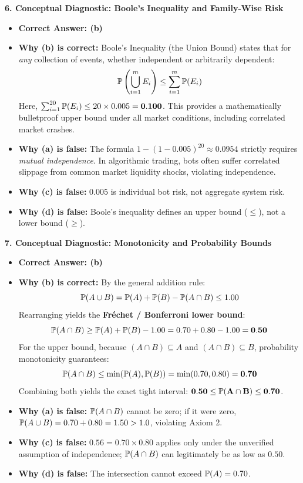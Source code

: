 \textbf{6. Conceptual Diagnostic: Boole's Inequality and Family-Wise Risk}
\begin{itemize}
    \item \textbf{Correct Answer: (b)}
    \item \textbf{Why (b) is correct:} Boole's Inequality (the Union Bound) states that for \emph{any} collection of events, whether independent or arbitrarily dependent:
    $$\P\left(\bigcup_{i=1}^m E_i\right) \le \sum_{i=1}^m \P(E_i)$$
    Here, $\sum_{i=1}^{20} \P(E_i) \le 20 \times 0.005 = \mathbf{0.100}$. This provides a mathematically bulletproof upper bound under all market conditions, including correlated market crashes.
    \item \textbf{Why (a) is false:} The formula $1 - (1 - 0.005)^{20} \approx 0.0954$ strictly requires \emph{mutual independence}. In algorithmic trading, bots often suffer correlated slippage from common market liquidity shocks, violating independence.
    \item \textbf{Why (c) is false:} $0.005$ is individual bot risk, not aggregate system risk.
    \item \textbf{Why (d) is false:} Boole's inequality defines an upper bound ($\le$), not a lower bound ($\ge$).
\end{itemize}

\textbf{7. Conceptual Diagnostic: Monotonicity and Probability Bounds}
\begin{itemize}
    \item \textbf{Correct Answer: (b)}
    \item \textbf{Why (b) is correct:} By the general addition rule:
    $$\P(A \cup B) = \P(A) + \P(B) - \P(A \cap B) \le 1.00$$
    Rearranging yields the \textbf{Fréchet / Bonferroni lower bound}:
    $$\P(A \cap B) \ge \P(A) + \P(B) - 1.00 = 0.70 + 0.80 - 1.00 = \mathbf{0.50}$$
    For the upper bound, because $(A \cap B) \subseteq A$ and $(A \cap B) \subseteq B$, probability monotonicity guarantees:
    $$\P(A \cap B) \le \min(\P(A), \P(B)) = \min(0.70, 0.80) = \mathbf{0.70}$$
    Combining both yields the exact tight interval: $\mathbf{0.50 \le \P(A \cap B) \le 0.70}$.
    \item \textbf{Why (a) is false:} $\P(A \cap B)$ cannot be zero; if it were zero, $\P(A \cup B) = 0.70 + 0.80 = 1.50 > 1.0$, violating Axiom 2.
    \item \textbf{Why (c) is false:} $0.56 = 0.70 \times 0.80$ applies only under the unverified assumption of independence; $\P(A \cap B)$ can legitimately be as low as $0.50$.
    \item \textbf{Why (d) is false:} The intersection cannot exceed $\P(A) = 0.70$.
\end{itemize}


